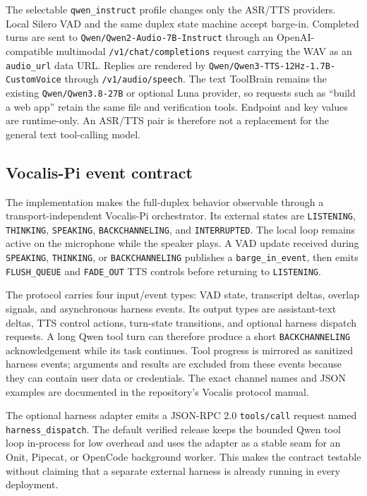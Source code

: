 \documentclass[sigconf,nonacm]{acmart}
\begin{document}
The selectable \texttt{qwen\_instruct} profile changes only the ASR/TTS
providers. Local Silero VAD and the same duplex state machine accept barge-in.
Completed turns are sent to \texttt{Qwen/Qwen2-Audio-7B-Instruct} through an
OpenAI-compatible multimodal \texttt{/v1/chat/completions} request carrying
the WAV as an \texttt{audio\_url} data URL. Replies are rendered by
\texttt{Qwen/Qwen3-TTS-12Hz-1.7B-CustomVoice} through
\texttt{/v1/audio/speech}. The text ToolBrain remains the existing
\texttt{Qwen/Qwen3.8-27B} or optional Luna provider, so requests such as
``build a web app'' retain the same file and verification tools. Endpoint and
key values are runtime-only. An ASR/TTS pair is therefore not a replacement
for the general text tool-calling model.

\subsection{Vocalis-Pi event contract}

The implementation makes the full-duplex behavior observable through a
transport-independent Vocalis-Pi orchestrator. Its external states are
\texttt{LISTENING}, \texttt{THINKING}, \texttt{SPEAKING},
\texttt{BACKCHANNELING}, and \texttt{INTERRUPTED}. The local loop remains
active on the microphone while the speaker plays. A VAD update received during
\texttt{SPEAKING}, \texttt{THINKING}, or \texttt{BACKCHANNELING} publishes a
\texttt{barge\_in\_event}, then emits \texttt{FLUSH\_QUEUE} and
\texttt{FADE\_OUT} TTS controls before returning to \texttt{LISTENING}.

The protocol carries four input/event types: VAD state, transcript deltas,
overlap signals, and asynchronous harness events. Its output types are
assistant-text deltas, TTS control actions, turn-state transitions, and
optional harness dispatch requests. A long Qwen tool turn can therefore
produce a short \texttt{BACKCHANNELING} acknowledgement while its task
continues. Tool progress is mirrored as sanitized harness events; arguments
and results are excluded from these events because they can contain user data
or credentials. The exact channel names and JSON examples are documented in
the repository's Vocalis protocol manual.

The optional harness adapter emits a JSON-RPC 2.0 \texttt{tools/call} request
named \texttt{harness\_dispatch}. The default verified release keeps the
bounded Qwen tool loop in-process for low overhead and uses the adapter as a
stable seam for an Onit, Pipecat, or OpenCode background worker. This makes
the contract testable without claiming that a separate external harness is
already running in every deployment.
\end{document}
